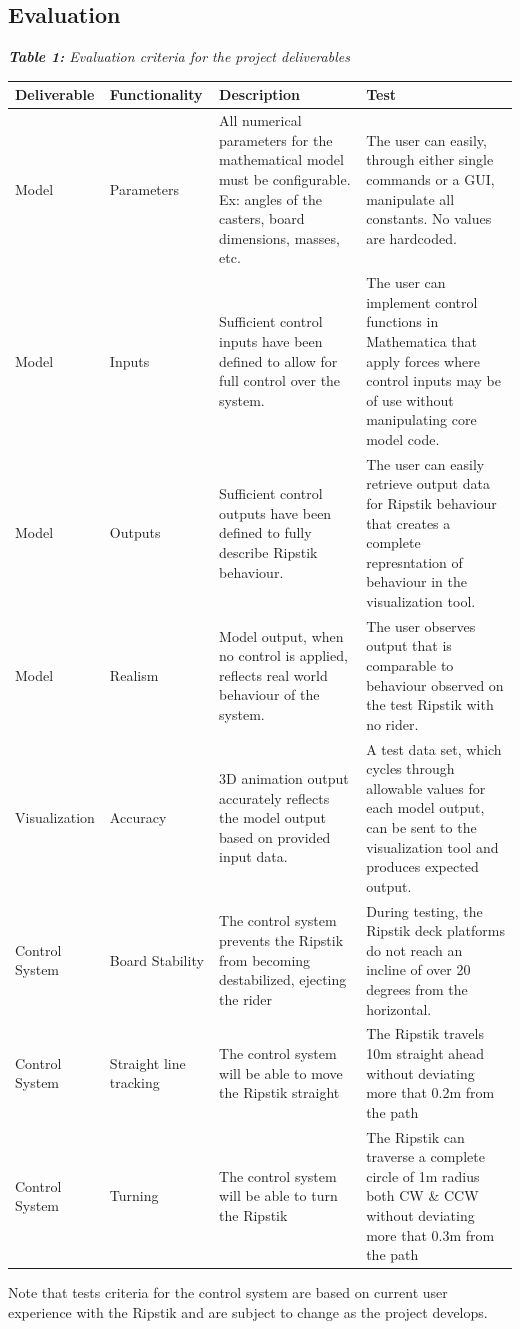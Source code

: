 \subsection{Evaluation}
\begin{center}
\textit{\textbf{Table 1:} Evaluation criteria for the project deliverables}
  \begin{tabular}{|p{2.3cm}|p{2.5cm}|p{4.5cm}|p{5.7cm}|}
    \hline
    \textbf{Deliverable} & \textbf{Functionality} & \textbf{Description} & \textbf{Test} \\ \hline
    Model & Parameters & All numerical parameters for the mathematical model must be configurable. Ex: angles of the casters, board dimensions, masses, etc. & The user can easily, through either single commands or a GUI, manipulate all constants. No values are hardcoded. \\
    \hline 
    Model & Inputs & Sufficient control inputs have been defined to allow for full control over the system. & The user can implement control functions in Mathematica that apply forces where control inputs may be of use without manipulating core model code. \\
    \hline
    Model & Outputs & Sufficient control outputs have been defined to fully describe Ripstik behaviour. & The user can easily retrieve output data for Ripstik behaviour that creates a complete represntation of behaviour in the visualization tool. \\
    \hline
    Model & Realism & Model output, when no control is applied, reflects real world behaviour of the system. & The user observes output that is comparable to behaviour observed on the test Ripstik with no rider. \\
    \hline Visualization & Accuracy & 3D animation output accurately reflects the model output based on provided input data. & A test data set, which cycles through allowable values for each model output, can be sent to the visualization tool and produces expected output. \\
    \hline Control \newline System & Board \newline Stability & The control system prevents the Ripstik from becoming destabilized, ejecting the rider & During testing, the Ripstik deck platforms do not reach an incline of over 20 degrees from the horizontal. \\
    \hline Control \newline System & Straight line tracking & The control system will be able to move the Ripstik straight & The Ripstik travels 10m straight ahead without deviating more that 0.2m from the path \\
    \hline Control \newline System & Turning & The control system will be able to turn the Ripstik & The Ripstik can traverse a complete circle of 1m radius both CW \& CCW without deviating more that 0.3m from the path \\
    \hline
    \end{tabular}
\end{center}
Note that tests criteria for the control system are based on current user experience with the Ripstik and are subject to change as the project develops.